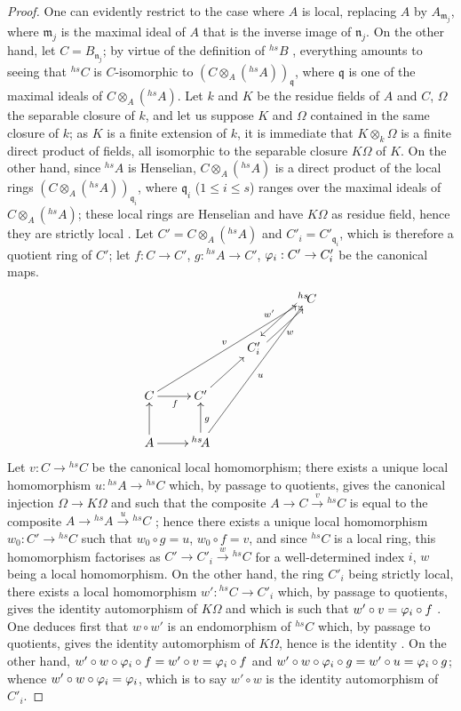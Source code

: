 \begin{proof}
One can evidently restrict to the case where $A$ is local, replacing $A$ by $A_{\mathfrak{m}_j}$, where $\mathfrak{m}_j$ is the maximal ideal of $A$ that is the inverse image of $\mathfrak{n}_j$.
On the other hand, let $C=B_{\mathfrak{n}_j}$;
by virtue of the definition of ${}^{hs}\!B$ , everything amounts to seeing that ${}^{hs}\!C$ is $C$-isomorphic to $(C\otimes_{A}({}^{hs}\!A))_{\mathfrak{q}}$, where $\mathfrak{q}$ is one of the maximal ideals of $C\otimes_{A}({}^{hs}\!A)$.
Let $k$ and $K$ be the residue fields of $A$ and $C$, $\Omega$ the separable closure of $k$, and let us suppose $K$ and $\Omega$ contained in the same closure of $k$;
as $K$ is a finite extension of $k$, it is immediate that $K\otimes_k\Omega$ is a finite direct product of fields, all isomorphic to the separable closure $K\Omega$ of $K$.
On the other hand, since ${}^{hs}\!A$ is Henselian, $C\otimes_{A}({}^{hs}\!A)$ is a direct product of the local rings $(C\otimes_{A}({}^{hs}\!A))_{\mathfrak{q}_i}$, where $\mathfrak{q}_i$ ($1\leq i\leq s$) ranges over the maximal ideals of $C\otimes_{A}({}^{hs}\!A)$; these local rings are Henselian  and have $K\Omega$ as residue field, hence they are strictly local .
Let $C'=C\otimes_{A}({}^{hs}\!A)$ and $C'_i=C'_{\mathfrak{q}_i}$, which is therefore a quotient ring of $C'$;
let $f:C\to C'$, $g:{}^{hs}\!A\to C'$, $\varphi_i:C'\to C'_i$ be the canonical maps.
\[
  \xymatrix{
    &&& {}^{hs}\!C \ar@<-0.8ex>[dl]_{w'} \\
    && C'_i \ar@<-0.8ex>[ur]_{w} \\
    C \ar[uurrr]^{v} \ar[r]_{f} & C' \ar[ur] \\
    A \ar[u] \ar[r] & {}^{hs}\!A \ar[u]_{g} \ar[uuurr]_{u}
  }
\]
Let $v:C\to{}^{hs}\!C$ be the canonical local homomorphism;
there exists a unique local homomorphism $u:{}^{hs}\!A\to{}^{hs}\!C$ which, by passage to quotients, gives the canonical injection $\Omega\to K\Omega$ and such that the composite $A\to C\xrightarrow{v}{}^{hs}\!C$ is equal to the composite $A\to{}^{hs}\!A\xrightarrow{u}{}^{hs}\!C$ ;
hence there exists a unique local homomorphism $w_0:C'\to{}^{hs}\!C$ such that $w_0\circ g=u$, $w_0\circ f=v$, and since ${}^{hs}\!C$ is a local ring, this homomorphism factorises as $C'\to C'_i\xrightarrow{w}{}^{hs}\!C$ for a well-determined index $i$, $w$ being a local homomorphism.
On the other hand, the ring $C'_i$ being strictly local, there exists a local homomorphism $w':{}^{hs}\!C\to C'_i$ which, by passage to quotients, gives the identity automorphism of $K\Omega$ and which is such that $w'\circ v=\varphi_i\circ f$ .
One deduces first that $w\circ w'$ is an endomorphism of ${}^{hs}\!C$ which, by passage to quotients, gives the identity automorphism of $K\Omega$, hence
is the identity .
On the other hand, $w'\circ w\circ\varphi_i\circ f=w'\circ v=\varphi_i\circ f$ and $w'\circ w\circ\varphi_i\circ g=w'\circ u=\varphi_i\circ g$;
whence $w'\circ w\circ\varphi_i=\varphi_i$, which is to say $w'\circ w$ is the identity automorphism of $C'_i$.
\end{proof}

